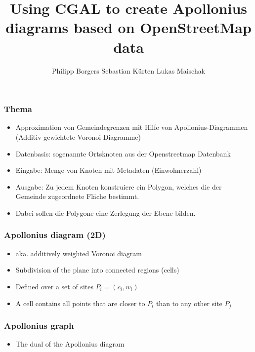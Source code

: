 \documentclass{beamer}
\title{Using CGAL to create Apollonius diagrams based on OpenStreetMap data}
\author[Sebastian Kürten, Philipp Borgers, Lukas Maischak]{
    Philipp Borgers
    \newline Sebastian Kürten
    \newline Lukas Maischak
}
\begin{document}
\begin{frame}
    \titlepage
\end{frame}

\begin{frame}
    \frametitle{Thema}
    \begin{itemize}
        \item Approximation von Gemeindegrenzen mit Hilfe von Apollonius-Diagrammen
        (Additiv gewichtete Voronoi-Diagramme)
        \item Datenbasis: sogenannte Ortsknoten aus der Openstreetmap Datenbank
        \item Eingabe: Menge von Knoten mit Metadaten (Einwohnerzahl)
        \item Ausgabe: Zu jedem Knoten konstruiere ein Polygon, welches die der Gemeinde
        zugeordnete Fläche bestimmt.
        \item Dabei sollen die Polygone eine Zerlegung der Ebene bilden.
    \end{itemize}
\end{frame}

\begin{frame}
    \frametitle{Apollonius diagram (2D)}
    \begin{itemize}
        \item aka. additively weighted Voronoi diagram
        \item Subdivision of the plane into connected regions (cells)
        \item Defined over a set of sites $P_i = (c_i, w_i)$
        \item A cell contains all points that are closer to $P_i$ than to any
            other site $P_j$
    \end{itemize}
\end{frame}

\begin{frame}
    \frametitle{Apollonius graph}
    \begin{itemize}
        \item The dual of the Apollonius diagram
    \end{itemize}
\end{frame}
\end{document}
